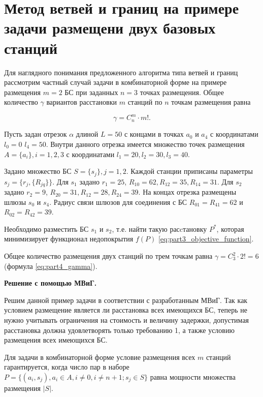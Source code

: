 

\section{Метод ветвей и границ на примере задачи размещени двух базовых станций}\label{part4:bnb_algorithm}

Для наглядного понимания предложенного алгоритма типа ветвей и границ рассмотрим частный случай задачи в комбинаторной форме на примере размещения $m = 2$ БС при заданных $n = 3$ точках размещения.  Общее количество $\gamma$ вариантов расстановки $m$ станций по $n$ точкам размещения равна 

\begin{equation}
  \label{eq:part4_gamma}
  \gamma = C^m_n \cdot m! .
\end{equation}



Пусть задан отрезок $\alpha$ длиной $L = 50$ с концами в точках $a_0$ и $a_4$ с координатами $l_0 = 0$ $l_4 = 50$. Внутри данного отрезка имеется множество точек размещения $A = \{a_i\}, i = 1, 2, 3$ с координатами $l_1 = 20, l_2 = 30, l_3 = 40$. 

Задано множество БС $S = \{ s_j \} , j = 1, 2$. Каждой станции приписаны параметры $s_j = \{ r_j, \{R_{jq}\}\}$.  Для $s_1$ задано $r_1 = 25$, $R_{10} = 62, R_{12} = 35, R_{14} = 31$. Для $s_2$ задано $r_2 = 9$, $R_{20} = 31, R_{12} = 28, R_{24} = 39$.
На концах отрезка размещены шлюзы $s_0$ и $s_4$. Радиус связи шлюзов для соединения с БС $R_{01} = R_{41} = 62$ и $R_{02} = R_{42} = 39$. 


Необходимо разместить БС $s_1$ и $s_2$, т.е. найти такую расcтановку $P^*$, которая минимизирует функционал недопокрытия $f(P)$ \cref{eq:part3_objective_function}.

Общее количество размещения двух станций по трем точкам равна $\gamma = C^2_3 \cdot 2! = 6$ (формула \cref{eq:part4_gamma}).

\textbf{Решение с помощью МВиГ.}

Решим данной пример задачи в соответствии с разработанным МВиГ. Так как  условием размещение является ли расстановка всех имеющихся БС, теперь не нужно учитывать ограничения на стоимость и величину задержки, допустимая расстановка должна удовлетворять только требованию 1, а также условию размещения всех имеющихся БС.

Для задачи в комбинаторной форме условие размещения всех $m$ станций гарантируется, когда число пар в наборе $P = \{ (a_i, s_j), a_i \in A, i \neq 0, i \neq n + 1; s_j \in S\}$ равна мощности множества размещения $|S|$. 


